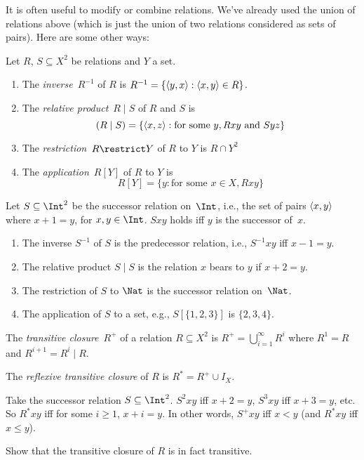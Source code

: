 \documentclass[../../include/open-logic-section]{subfiles}
\begin{document}

It is often useful to modify or combine relations. We've already used
the union of relations above (which is just the union of two relations
considered as sets of pairs). Here are some other ways:

\begin{defn} Let $R$, $S \subseteq X^2$ be relations and $Y$ a set.
\begin{enumerate}
\item The \emph{inverse}~$R^{-1}$ of $R$ is $R^{-1} = \{ \langle y,
    x \rangle : \langle x, y \rangle \in R \}$.
\item The \emph{relative product}~$R \mid S$ of $R$ and $S$ is
\[
(R \mid S) = \{\langle x, z \rangle : \text{for some } y, Rxy \text{ and } Syz\}
\]
\item The \emph{restriction}~$R \restrict Y$ of $R$ to $Y$ is $R \cap Y^2$
\item The \emph{application}~$R[Y]$ of $R$ to $Y$ is
\[
R[Y] = \{y : \text{for some } x \in X, Rxy\}
\]
\end{enumerate}
\end{defn}

\begin{ex}
Let $S \subseteq \Int^2$ be the successor relation on~$\Int$, i.e.,
the set of pairs $\langle x, y \rangle$ where $x + 1 = y$, for $x, y \in
\Int$. $Sxy$ holds iff $y$ is the successor of~$x$.
\begin{enumerate}
\item The inverse $S^{-1}$ of $S$ is the predecessor relation, i.e.,
  $S^{-1}xy$ iff $x-1 = y$.
\item The relative product $S\mid S$ is the relation $x$ bears to $y$
  if $x+2 = y$.
\item The restriction of $S$ to $\Nat$ is the successor relation
  on~$\Nat$.
\item The application of $S$ to a set, e.g., $S[\{1, 2, 3\}]$ is $\{2,
  3, 4\}$.
\end{enumerate}

\end{ex}

\begin{defn}
The \emph{transitive closure}~$R^+$ of a relation $R \subseteq X^2$ is
$R^+ = \bigcup_{i=1}^\infty R^i$ where $R^1 = R$ and $R^{i+1} = R^i
\mid R$.

The \emph{reflexive transitive closure} of $R$ is $R^* = R^+ \cup
I_X$.
\end{defn}

\begin{ex}
Take the successor relation $S \subseteq \Int^2$. $S^2xy$ iff $x + 2 =
y$, $S^3xy$ iff $x + 3 = y$, etc. So $R^*xy$ iff for some $i \ge 1$,
$x + i = y$. In other words, $S^+xy$ iff $x < y$ (and $R^*xy$ iff $x
\le y$).
\end{ex}

\begin{prob}
Show that the transitive closure of $R$ is in fact transitive.
\end{prob}
\end{document}

